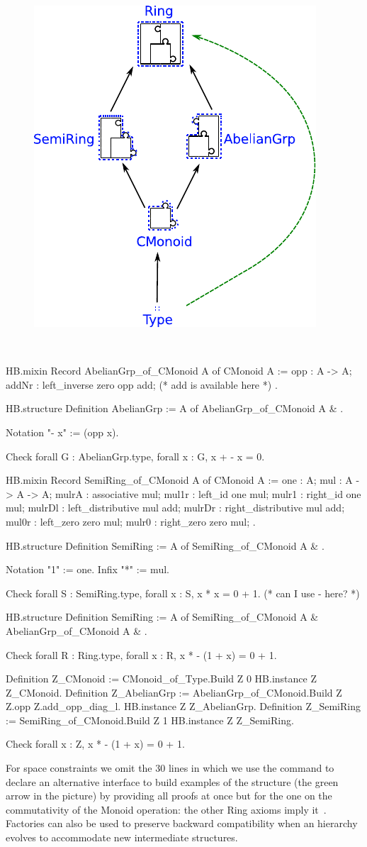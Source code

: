\documentclass{easychair}
\begin{document}
\begin{figure}
  \includegraphics[width=.4\textwidth]{diagram.pdf}
\end{figure}
\
\begin{coqcode}
HB.mixin Record AbelianGrp_of_CMonoid A of CMonoid A := {
  opp : A -> A;
  addNr : left_inverse zero opp add; (* add is available here *)
}.

HB.structure Definition AbelianGrp :=
  { A of AbelianGrp_of_CMonoid A & }.

Notation "- x" := (opp x).

Check forall G : AbelianGrp.type, forall x : G, x + - x = 0.

HB.mixin Record SemiRing_of_CMonoid A of CMonoid A := {
  one : A;
  mul : A -> A -> A;
  mulrA : associative mul;
  mul1r : left_id one mul;
  mulr1 : right_id one mul;
  mulrDl : left_distributive mul add;
  mulrDr : right_distributive mul add;
  mul0r : left_zero zero mul;
  mulr0 : right_zero zero mul;
}.

HB.structure Definition SemiRing := { A of SemiRing_of_CMonoid A & }.

Notation "1" := one.
Infix "*" := mul.

Check forall S : SemiRing.type, forall x : S, x * x = 0 + 1. (* can I use - here? *)

HB.structure Definition SemiRing := { A of SemiRing_of_CMonoid A & AbelianGrp_of_CMonoid A & }.

Check forall R : Ring.type, forall x : R, x * - (1 + x) = 0 + 1.

Definition Z_CMonoid := CMonoid_of_Type.Build Z 0%
HB.instance Z Z_CMonoid.
Definition Z_AbelianGrp := AbelianGrp_of_CMonoid.Build Z Z.opp Z.add_opp_diag_l.
HB.instance Z Z_AbelianGrp.
Definition Z_SemiRing := SemiRing_of_CMonoid.Build Z 1%
HB.instance Z Z_SemiRing.

Check forall x : Z, x * - (1 + x) = 0 + 1.
\end{coqcode}

For space constraints we omit the 30 lines in which we use
the  command to declare an alternative interface
to build examples of the \coq{Ring} structure (the green
arrow in the picture) by providing all proofs at once but for the
one on the commutativity of the Monoid operation:
the other Ring axioms imply it~\cite{nearrings}. Factories can also be used to
preserve backward compatibility when an hierarchy evolves to accommodate
new intermediate  structures.


\end{document}
